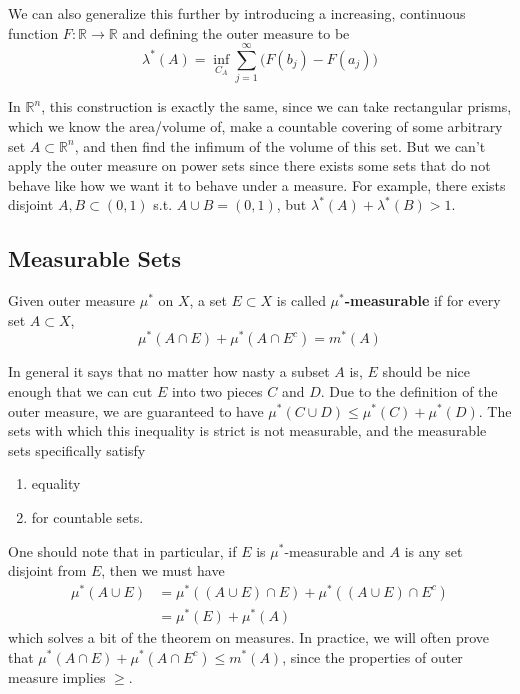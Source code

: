   We can also generalize this further by introducing a increasing, continuous function $F: \mathbb{R} \rightarrow \mathbb{R}$ and defining the outer measure to be 
  \begin{equation}
   \lambda^\ast (A) = \inf_{C_A} \sum_{j=1}^\infty \big( F(b_j) - F(a_j) \big) 
  \end{equation}

  In $\mathbb{R}^n$, this construction is exactly the same, since we can take rectangular prisms, which we know the area/volume of, make a countable covering of some arbitrary set $A \subset \mathbb{R}^n$, and then find the infimum of the volume of this set. But we can't apply the outer measure on power sets since there exists some sets that do not behave like how we want it to behave under a measure. For example, there exists disjoint $A, B \subset (0, 1)$ s.t. $A \cup B = (0, 1)$, but $\lambda^*(A) + \lambda^*(B) > 1$. 

\subsection{Measurable Sets} 

  \begin{definition}
    Given outer measure $\mu^\ast$ on $X$, a set $E \subset X$  is called \textbf{$\mu^\ast$-measurable} if for every set $A \subset X$, 
    \begin{equation}
      \mu^\ast (A \cap E) + \mu^\ast (A \cap E^c) = m^\ast (A) 
    \end{equation}

  \end{definition} 

  In general it says that no matter how nasty a subset $A$ is, $E$ should be nice enough that we can cut $E$ into two pieces $C$ and $D$. Due to the definition of the outer measure, we are guaranteed to have  $\mu^\ast (C \cup D) \leq \mu^\ast (C) + \mu^\ast (D)$. The sets with which this inequality is strict is not measurable, and the measurable sets specifically satisfy 
  \begin{enumerate}
    \item equality 
    \item for countable sets. 
  \end{enumerate}

  One should note that in particular, if $E$ is $\mu^\ast$-measurable and $A$ is any set disjoint from $E$, then we must have 
  \begin{align}
    \mu^\ast (A \cup E) & = \mu^\ast ((A \cup E) \cap E) + \mu^\ast ((A \cup E) \cap E^c) \\ 
                        & = \mu^\ast (E) + \mu^\ast (A)
  \end{align}
  which solves a bit of the theorem on measures. In practice, we will often prove that $\mu^\ast (A \cap E) + \mu^\ast (A \cap E^c) \leq m^\ast (A)$, since the properties of outer measure implies $\geq$. 

